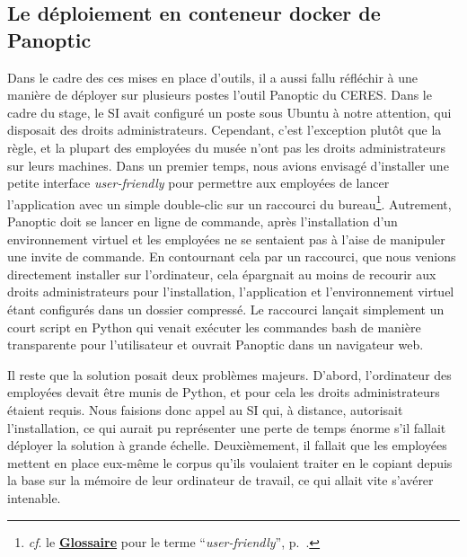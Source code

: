 \subsection{Le déploiement en conteneur docker de Panoptic}

Dans le cadre des ces mises en place d'outils, il a aussi fallu réfléchir à une manière de déployer sur plusieurs postes l'outil Panoptic du CERES. Dans le cadre du stage, le SI avait configuré un poste sous Ubuntu à notre attention, qui disposait des droits administrateurs. Cependant, c'est l'exception plutôt que la règle, et la plupart des employé\wokisme e\wokisme s du musée n'ont pas les droits administrateurs sur leurs machines. Dans un premier temps, nous avions envisagé d'installer une petite interface \textit{user-friendly} pour permettre aux employé\wokisme e\wokisme s de lancer l'application avec un simple double-clic sur un raccourci du bureau\footnote{\textit{cf}. le \textbf{\hyperref[sec:Glossaire]{Glossaire}} pour le terme \enquote{\textit{user-friendly}}, p.~\pageref{sec:Glossaire}.}. Autrement, Panoptic doit se lancer en ligne de commande, après l'installation d'un environnement virtuel et les employé\wokisme e\wokisme s ne se sentaient pas à l'aise de manipuler une invite de commande. En contournant cela par un raccourci, que nous venions directement installer sur l'ordinateur, cela épargnait au moins de recourir aux droits administrateurs pour l'installation, l'application et l'environnement virtuel étant configurés dans un dossier compressé. Le raccourci lançait simplement un court script en Python qui venait exécuter les commandes bash de manière transparente pour l'utilisateur et ouvrait Panoptic dans un navigateur web. 

Il reste que la solution posait deux problèmes majeurs. D'abord, l'ordinateur des employé\wokisme e\wokisme s devait être munis de Python, et pour cela les droits administrateurs étaient requis. Nous faisions donc appel au SI qui, à distance, autorisait l'installation, ce qui aurait pu représenter une perte de temps énorme s'il fallait déployer la solution à grande échelle. Deuxièmement, il fallait que les employé\wokisme e\wokisme s mettent en place eux-même le corpus qu'ils voulaient traiter en le copiant depuis la base sur la mémoire de leur ordinateur de travail, ce qui allait vite s'avérer intenable. \hfill \break

